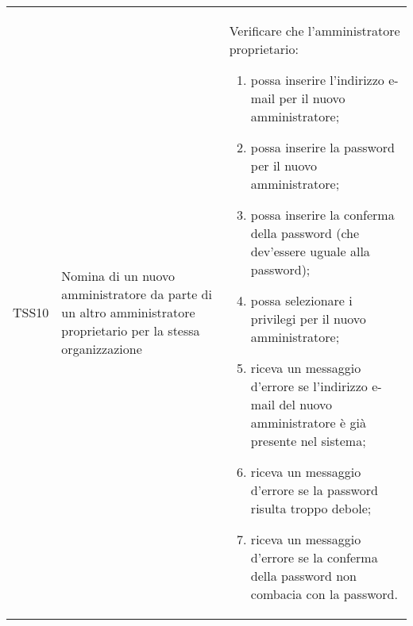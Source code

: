 {\begin{longtable}{ c | C{3cm} | C{11cm} }
TSS10 & Nomina di un nuovo amministratore da parte di un altro amministratore proprietario per la stessa organizzazione & 
Verificare che l'amministratore proprietario:
\begin{enumerate}
    \item possa inserire l'indirizzo e-mail per il nuovo amministratore;
    \item possa inserire la password per il nuovo amministratore;
    \item possa inserire la conferma della password (che dev'essere uguale alla password);
    \item possa selezionare i privilegi per il nuovo amministratore;
    \item riceva un messaggio d'errore se l'indirizzo e-mail del nuovo amministratore è già presente nel sistema;
    \item riceva un messaggio d'errore se la password risulta troppo debole;
    \item riceva un messaggio d'errore se la conferma della password non combacia con la password.
\end{enumerate} \\
\end{longtable}
}